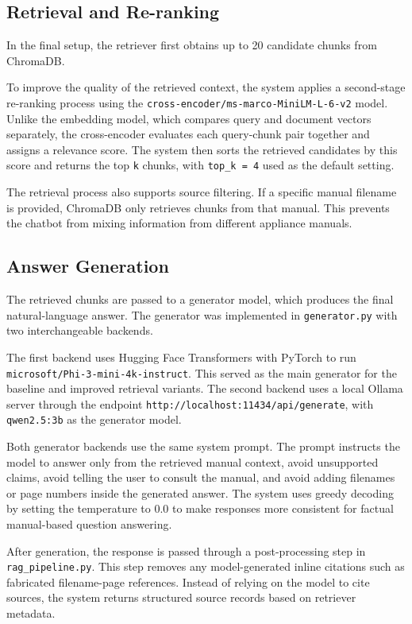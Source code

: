 \subsection{Retrieval and Re-ranking}

In the final setup, the retriever first obtains up to 20 candidate chunks from ChromaDB.

To improve the quality of the retrieved context, the system applies a second-stage re-ranking process using the \texttt{cross-encoder/ms-marco-MiniLM-L-6-v2} model. Unlike the embedding model, which compares query and document vectors separately, the cross-encoder evaluates each query-chunk pair together and assigns a relevance score. The system then sorts the retrieved candidates by this score and returns the top \texttt{k} chunks, with \texttt{top\_k = 4} used as the default setting.

The retrieval process also supports source filtering. If a specific manual filename is provided, ChromaDB only retrieves chunks from that manual. This prevents the chatbot from mixing information from different appliance manuals.

\subsection{Answer Generation}

The retrieved chunks are passed to a generator model, which produces the final natural-language answer. The generator was implemented in \texttt{generator.py} with two interchangeable backends.

The first backend uses Hugging Face Transformers with PyTorch to run \texttt{microsoft/Phi-3-mini-4k-instruct}. This served as the main generator for the baseline and improved retrieval variants. The second backend uses a local Ollama server through the endpoint \texttt{http://localhost:11434/api/generate}, with \texttt{qwen2.5:3b} as the generator model.

Both generator backends use the same system prompt. The prompt instructs the model to answer only from the retrieved manual context, avoid unsupported claims, avoid telling the user to consult the manual, and avoid adding filenames or page numbers inside the generated answer. The system uses greedy decoding by setting the temperature to 0.0 to make responses more consistent for factual manual-based question answering.

After generation, the response is passed through a post-processing step in \texttt{rag\_pipeline.py}. This step removes any model-generated inline citations such as fabricated filename-page references. Instead of relying on the model to cite sources, the system returns structured source records based on retriever metadata.

